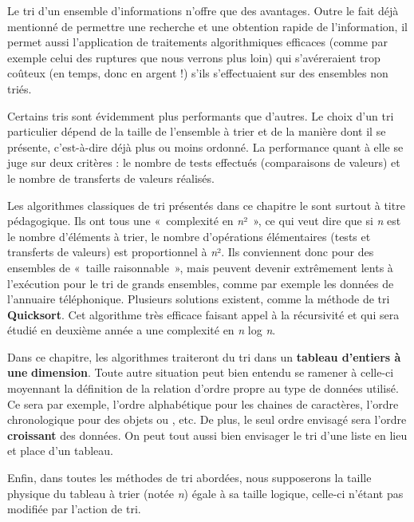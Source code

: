 		Le tri d’un ensemble d’informations n’offre que des avantages. Outre le
		fait déjà mentionné de permettre une recherche et une obtention rapide
		de l’information, il permet aussi l’application de traitements
		algorithmiques efficaces (comme par exemple celui des ruptures que nous
		verrons plus loin) qui s’avéreraient trop coûteux (en temps, donc en
		argent !) s’ils s’effectuaient sur des ensembles non triés.

		Certains tris sont évidemment plus performants que d’autres. Le choix
		d’un tri particulier dépend de la taille de l’ensemble à trier et de la
		manière dont il se présente, c’est-à-dire déjà plus ou moins ordonné.
		La performance quant à elle se juge sur deux critères : le nombre de
		tests effectués (comparaisons de valeurs) et le nombre de transferts de
		valeurs réalisés. 
		
		Les algorithmes classiques de tri présentés dans ce chapitre le sont
		surtout à titre pédagogique. Ils ont tous une «~complexité en
		\textit{n}²~», ce qui veut dire que si \textit{n} est le nombre
		d’éléments à trier, le nombre d’opérations élémentaires (tests et
		transferts de valeurs) est proportionnel à \textit{n}². Ils conviennent
		donc pour des ensembles de «~taille raisonnable~», mais peuvent devenir
		extrêmement lents à l’exécution pour le tri de grands ensembles, comme
		par exemple les données de l’annuaire téléphonique. Plusieurs solutions
		existent, comme la méthode de tri \textbf{Quicksort}. Cet algorithme
		très efficace faisant appel à la récursivité et qui sera étudié en
		deuxième année a une complexité en \textit{n} log \textit{n}. 

		Dans ce chapitre, les algorithmes traiteront du tri dans un
		\textbf{tableau d’entiers à une }\textbf{dimension}. Toute autre
		situation peut bien entendu se ramener à celle-ci moyennant la
		définition de la relation d’ordre propre au type de données utilisé. Ce
		sera par exemple, l’ordre alphabétique pour les chaines de caractères,
		l’ordre chronologique pour des objets  ou
		, etc. De plus, le seul ordre envisagé sera l’ordre
		\textbf{croissant} des données. On peut tout aussi bien envisager le
		tri d’une liste en lieu et place d’un tableau.

		Enfin, dans toutes les méthodes de tri abordées, nous supposerons la
		taille physique du tableau à trier (notée \textit{n}) égale à sa taille
		logique, celle-ci n’étant pas modifiée par l’action de tri.

